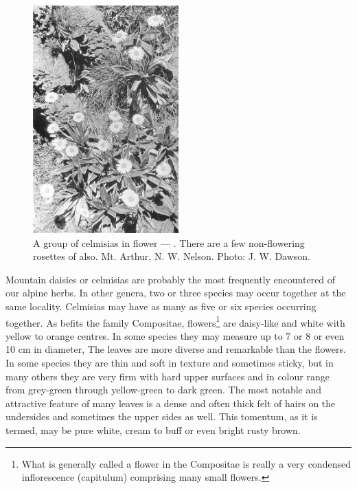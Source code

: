 \begin{figure}
	\includegraphics[width=0.5\textwidth]{graphics/figure102celmisias.jpg}
	\centering
	\caption[A group of celmisias in flower]{A group of celmisias in flower --- .
	There are a few non-flowering rosettes of  also.
	Mt. Arthur,  N. W. Nelson.
	Photo: J. W. Dawson.}%
	\label{fig:102celmisias}
\end{figure}

Mountain daisies or celmisias are probably the most frequently encountered of our alpine herbs.
In other genera, two or three species may occur together at the same locality.
Celmisias may have as many as five or six species occurring together.
As befits the family Compositae,  flowers\footnote{What is generally called a flower in the Compositae is really a very condensed inflorescence (capitulum) comprising many small flowers.} are daisy-like and white with yellow to orange centres.
In some species they may measure up to 7 or 8 or even 10 cm in diameter, The leaves are more diverse and remarkable than the flowers.
In some species they are thin and soft in texture and sometimes sticky, but in many others they are very firm with hard upper surfaces and in colour range from grey-green through yellow-green to dark green.
The most notable and attractive feature of many  leaves is a dense and often thick felt of hairs on the undersides and sometimes the upper sides as well.
This tomentum, as it is termed, may be pure white, cream to buff or even bright rusty brown.

